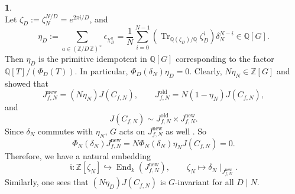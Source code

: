 \documentclass{amsart}[11pt]
\theoremstyle{definition}
\newtheorem{sect}[thm]{}
\numberwithin{equation}{section}
\theoremstyle{notitle}
\begin{document}
\begin{sect}
\begin{equation}
\end{equation}
Let  $\zeta_D:=\zeta_N^{N/D}=e^{2\pi i/D}$, and 
\begin{equation}
  \label{eq:21}
 \eta_D:=\sum_{a\in {(\mathbb{Z}/ {D}\, \mathbb{Z})^\times}}
\epsilon_{\chi_D^a}=\frac{1}{N}\sum_{i=0}^{N-1}
(\operatorname{Tr}_{{\mathbb{Q}}(\zeta_D)/{\mathbb{Q}}}\zeta_D^i) \delta_N^{N-i}\in {\mathbb{Q}}[G].
\end{equation}
Then $\eta_D$ is the primitive idempotent in ${\mathbb{Q}}[G]$ corresponding to
the factor ${\mathbb{Q}}[T]/(\Phi_D(T))$.  In particular,
$\Phi_D(\delta_N)\eta_D=0$.  Clearly, $N\eta_N\in {\mathbb{Z}}[G]$ and
\cite[Corollary 5.3]{MR1708603} showed that
\begin{equation}
  \label{eq:12}
  J_{f,N}^{\mathrm{new}}= (N\eta_N) J(C_{f,N}),\qquad J_{f,N}^{\mathrm{old}}= N(1-\eta_N)J(C_{f,N}),
\end{equation}
and
\begin{equation}
  \label{eq:20}
  J(C_{f, N})\sim J_{f,N}^{\mathrm{old}}\times J_{f,N}^{\mathrm{new}}. 
\end{equation}
Since $\delta_N$ commutes with $\eta_N$, $G$ acts on $J_{f,N}^{\mathrm{new}}$ as
well . So \[\Phi_N(\delta_N) J_{f,N}^{\mathrm{new}} = N\Phi_N(\delta_N)\eta_N
J(C_{f,N})=0.\] Therefore, we have a natural embedding
\begin{equation}
  \label{eq:13}
{\mathfrak{i}}:   {\mathbb{Z}}[\zeta_N]\hookrightarrow \operatorname{End}_k(J_{f,N}^{\mathrm{new}}),\qquad \zeta_N\mapsto \delta_N\mid_{J_{f,N}^{\mathrm{new}}}.
 \end{equation}
Similarly, one sees that $(N\eta_D)J(C_{f,N})$ is $G$-invariant
for all $D\mid N$. 
\end{sect}
\end{document}
